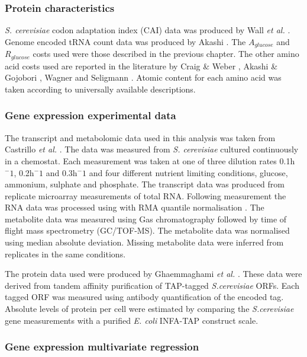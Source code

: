\subsubsection{Protein characteristics}

\emph{S. cerevisiae} codon adaptation index (CAI) data was produced by Wall \emph{et al.} \cite{wall2005}. Genome encoded tRNA count data was produced by Akashi \cite{akashi2003}. The $A_{glucose}$ and $R_{glucose}$ costs used were those described in the previous chapter. The other amino acid costs used are reported in the literature by Craig \& Weber \cite{craig1998}, Akashi \& Gojobori \cite{akashi2002}, Wagner \cite{wagner2005} and Seligmann \cite{seligmann2003}. Atomic content for each amino acid was taken according to universally available descriptions.

\subsubsection{Gene expression experimental data}

The transcript and metabolomic data used in this analysis was taken from Castrillo \emph{et al.} \cite{castrillo2007}. The data was measured from \emph{S. cerevisiae} cultured continuously in a chemostat. Each measurement was taken at one of three dilution rates 0.1h$^-1$, 0.2h$^-1$ and 0.3h$^-1$ and four different nutrient limiting conditions, glucose, ammonium, sulphate and phosphate. The transcript data was produced from replicate microarray measurements of total RNA. Following measurement the RNA data was processed using with RMA quantile normalisation \cite{bolstad2003}. The metabolite data was measured using Gas chromatography followed by time of flight mass spectrometry (GC/TOF-MS). The metabolite data was normalised using median absolute deviation. Missing metabolite data were inferred from replicates in the same conditions.

The protein data used were produced by Ghaemmaghami \emph{et al.} \cite{ghaemmaghami2003}. These data were derived from tandem affinity purification of TAP-tagged \emph{S.cerevisiae} ORFs. Each tagged ORF was measured using antibody quantification of the encoded tag. Absolute levels of protein per cell were estimated by comparing the \emph{S.cerevisiae} gene measurements with a purified \emph{E. coli} INFA-TAP construct scale.

\subsubsection{Gene expression multivariate regression}

